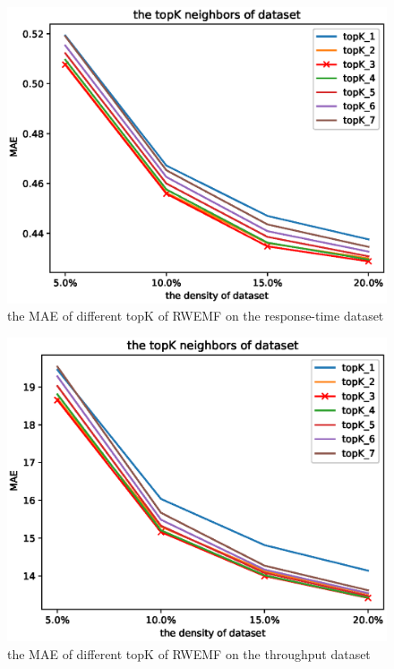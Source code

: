 \documentclass[conference]{IEEEtran}
\begin{document}
\begin{figure}[H]  
\centering  
\includegraphics[width=0.45\paperwidth]{topk_rt.eps}  
\caption{the MAE of different topK of RWEMF on the response-time dataset }  
\label{fig_rt}  
\end{figure} 

\begin{figure}[H] 
\centering  
\includegraphics[width=0.45\paperwidth]{topk_tp.eps}  
\caption{the MAE of different topK of RWEMF on the throughput dataset }  
\label{fig_tp}  
\end{figure} 
\end{document}
